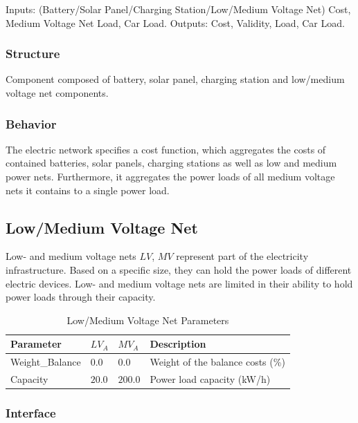 Inputs: (Battery/Solar Panel/Charging Station/Low/Medium Voltage Net) Cost, Medium Voltage Net Load, Car Load. Outputs: Cost, Validity, Load, Car Load.

\subsubsection{Structure}

Component composed of battery, solar panel, charging station and low/medium voltage net components.

\subsubsection{Behavior}

The electric network specifies a cost function, which aggregates the costs of contained batteries, solar panels, charging stations as well as low and medium power nets. Furthermore, it aggregates the power loads of all medium voltage nets it contains to a single power load.

\subsection{Low/Medium Voltage Net}

Low- and medium voltage nets $LV$, $MV$ represent part of the electricity infrastructure. Based on a specific size, they can hold the power loads of different electric devices. Low- and medium voltage nets are limited in their ability to hold power loads through their capacity.

\begin{table}[h]
	\renewcommand{\arraystretch}{1.3}
	\caption{Low/Medium Voltage Net Parameters}
	\centering
	\begin{tabular}{llll}
		\hline
		\textbf{Parameter}   & \textbf{$LV_{A}$} & \textbf{$MV_{A}$}  & Description \\ \hline
		Weight\_Balance       & $0.0$ & $0.0$ & Weight of the balance costs (\%) \\  
		Capacity          & $20.0$ & $200.0$ & Power load capacity (kW/h)     \\ \hline
	\end{tabular}
\end{table}

\subsubsection{Interface}

